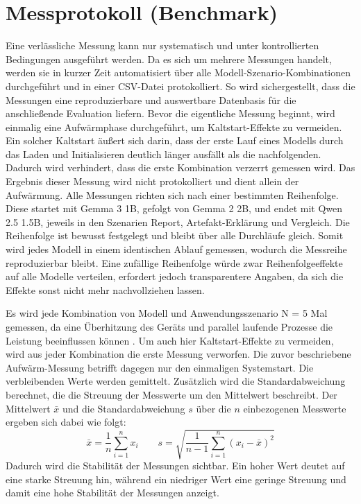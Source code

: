 \section{Messprotokoll (Benchmark)}
\label{sec:messprotokoll}
Eine verlässliche Messung kann nur systematisch und unter kontrollierten Bedingungen ausgeführt werden. Da es sich um mehrere Messungen handelt, werden sie in kurzer Zeit automatisiert über alle Modell-Szenario-Kombinationen durchgeführt und in einer \ac{CSV}-Datei protokolliert. So wird sichergestellt, dass die Messungen eine reproduzierbare und auswertbare Datenbasis für die anschließende Evaluation liefern.
Bevor die eigentliche Messung beginnt, wird einmalig eine Aufwärmphase durchgeführt, um Kaltstart-Effekte zu vermeiden. Ein solcher Kaltstart äußert sich darin, dass der erste Lauf eines Modells durch das Laden und Initialisieren deutlich länger ausfällt als die nachfolgenden. Dadurch wird verhindert, dass die erste Kombination verzerrt gemessen wird. Das Ergebnis dieser Messung wird nicht protokolliert und dient allein der Aufwärmung. Alle Messungen richten sich nach einer bestimmten Reihenfolge. Diese startet mit Gemma 3 1B, gefolgt von Gemma 2 2B, und endet mit Qwen 2.5 1.5B, jeweils in den Szenarien Report, Artefakt-Erklärung und Vergleich. Die Reihenfolge ist bewusst festgelegt und bleibt über alle Durchläufe gleich. Somit wird jedes Modell in einem identischen Ablauf gemessen, wodurch die Messreihe reproduzierbar bleibt. Eine zufällige Reihenfolge würde zwar Reihenfolgeeffekte auf alle Modelle verteilen, erfordert jedoch transparentere Angaben, da sich die Effekte sonst nicht mehr nachvollziehen lassen.
\vspace{\baselineskip}

\noindent Es wird jede Kombination von Modell und Anwendungsszenario N = 5 Mal gemessen, da eine Überhitzung des Geräts und parallel laufende Prozesse die Leistung beeinflussen können \autocite{guo2025llm}. Um auch hier Kaltstart-Effekte zu vermeiden, wird aus jeder Kombination die erste Messung verworfen. Die zuvor beschriebene Aufwärm-Messung betrifft dagegen nur den einmaligen Systemstart. Die verbleibenden Werte werden gemittelt. Zusätzlich wird die Standardabweichung berechnet, die die Streuung der Messwerte um den Mittelwert beschreibt. Der Mittelwert $\bar{x}$ und die Standardabweichung $s$ über die $n$ einbezogenen Messwerte ergeben sich dabei wie folgt:
\begin{equation}
    \bar{x} = \frac{1}{n}\sum_{i=1}^{n} x_i
    \qquad
    s = \sqrt{\frac{1}{n-1}\sum_{i=1}^{n}\left(x_i - \bar{x}\right)^2}
\end{equation}
Dadurch wird die Stabilität der Messungen sichtbar. Ein hoher Wert deutet auf eine starke Streuung hin, während ein niedriger Wert eine geringe Streuung und damit eine hohe Stabilität der Messungen anzeigt.
\vspace{\baselineskip}

